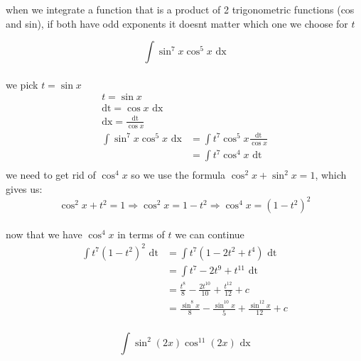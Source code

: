 \documentclass[a4paper,12pt]{article}
\newcommand{\?}{\stackrel{?}{=}}
\begin{document}
\begin{definition}
\begin{my_example}
\begin{note}
when we integrate a function that is a product of 2 trigonometric functions (cos and sin), if both have odd exponents it doesnt matter which one we choose for \(t\)\\[0pt]
\end{note}
\[
  \int \sin^7{x} \cos^5{x} \text{ dx}
\]\\[0pt]
we pick \(t = \sin x\)\\[0pt]
\begin{align*}
  t = \sin{x}\\
  \text{dt} = \cos{x} \text{ dx}\\
  \text{dx} = \frac{\text{dt}}{\cos x}\\
  \int \sin^7{x} \cos^5{x} \text{ dx} &= \int t^7 \cos^5{x} \frac{\text{dt}}{\cos x}\\
  &= \int t^7 \cos^4{x} \text{ dt}\\
\end{align*}
we need to get rid of \(\cos^4 x\) so we use the formula \(\cos^2 x + \sin^2 x = 1\), which gives us:\\[0pt]
\[
  \cos^2 x + t^2 = 1 \Rightarrow \cos^2 x = 1 - t^2 \Rightarrow \cos^4 x = {(1 - t^2)}^2
\]\\[0pt]
now that we have \(\cos^4 x\) in terms of \(t\) we can continue\\[0pt]
\begin{align*}
  \int t^7 {(1-t^2)}^2 \text{ dt} &= \int t^7(1 - 2t^2 + t^4) \text{ dt}\\
  &= \int t^7 - 2t^9 + t^{11} \text{ dt}\\
  &= \frac{t^8}{8} - \frac{2t^{10}}{10} + \frac{t^{12}}{12} + c\\
  &= \frac{\sin^8{x}}{8} - \frac{\sin^{10} x}{5} + \frac{\sin^{12} x}{12} + c\\
\end{align*}
\end{my_example}

\begin{my_example}
\[ \int \sin^2(2x) \cos^{11}(2x) \text{ dx} \]\\[0pt]
\end{my_example}


\end{definition}
\end{document}
